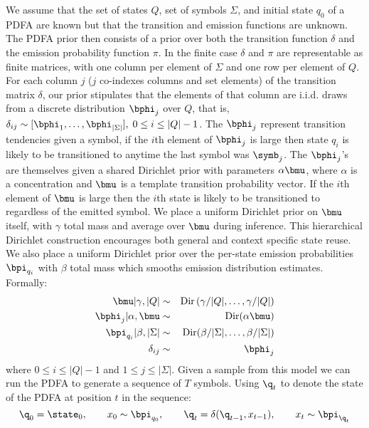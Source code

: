 We assume that the set of states $Q$, set of symbols $\Sigma$, and initial state $q_0$ of a PDFA are known but that the transition and emission functions are unknown.  The PDFA prior then consists of a prior over both the transition function $\delta$ and the emission probability function $\pi$.  In the finite case $\delta$ and $\pi$ are representable as finite matrices, with one column per element of $\Sigma$ and one row per element of $Q$.  For each column $j$ ($j$ co-indexes columns and set elements) of the transition matrix $\delta$, our prior stipulates that the elements of that column are  i.i.d. draws from a discrete distribution $\bphi_j$ over $Q$, that is, $\delta_{ij} \sim [\bphi_1,\ldots,\bphi_{|\Sigma|}], \; 0 \leq i\leq|Q|-1$.  The $\bphi_j$ represent transition tendencies given a symbol, if the $i$th element of $\bphi_{j}$ is large then state $q_i$ is likely to be transitioned to anytime the last symbol was $\symb_j$.   The $\bphi_{j}$'s are themselves given a shared Dirichlet prior with parameters $\alpha\bmu$, where $\alpha$ is a concentration and $\bmu$ is a template transition probability vector.   If the $i$th element of $\bmu$ is large then the $i$th state is likely to be transitioned to regardless of the emitted symbol.  We place a uniform Dirichlet prior on $\bmu$ itself, with $\gamma$ total mass and average over $\bmu$ during inference.  This hierarchical Dirichlet construction encourages both general and context specific state reuse.
 We also place a uniform Dirichlet prior over the per-state emission probabilities $\bpi_{q_i}$ with $\beta$ total mass which smooths emission distribution estimates.  Formally:
%
\begin{eqnarray}
\bmu|\gamma,|Q| & \sim & \mathrm{Dir}\left(\gamma/|Q|,\ldots,\gamma/|Q|\right) \label{gen:mu}  \\
\bphi_{j}|\alpha,\bmu  & \sim & \mathrm{Dir}(\alpha\bmu) \label{gen:phi} \\
\bpi_{q_i}|\beta,|\Sigma| & \sim & \mathrm{Dir}(\beta/|\Sigma|,\ldots,\beta/|\Sigma|) \label{gen:pi} \nonumber \\
\delta_{ij} & \sim & \bphi_{j} \label{gen:delta} \nonumber
\end{eqnarray}
%
where $0 \leq i \leq |Q|-1$ and $1 \leq j \leq |\Sigma|$.  Given a sample from this model we can run the PDFA to generate a sequence of $T$ symbols.  Using $\q_t$ to denote the state of the PDFA at position $t$ in the sequence:
%
\begin{equation}
\q_0 = \state_0, \qquad
x_0 \sim \bpi_{q_0}, \qquad
\q_t = \delta(\q_{t-1},x_{t-1}), \qquad
x_t \sim \bpi_{\q_t} \label{gen} \nonumber
\end{equation}

